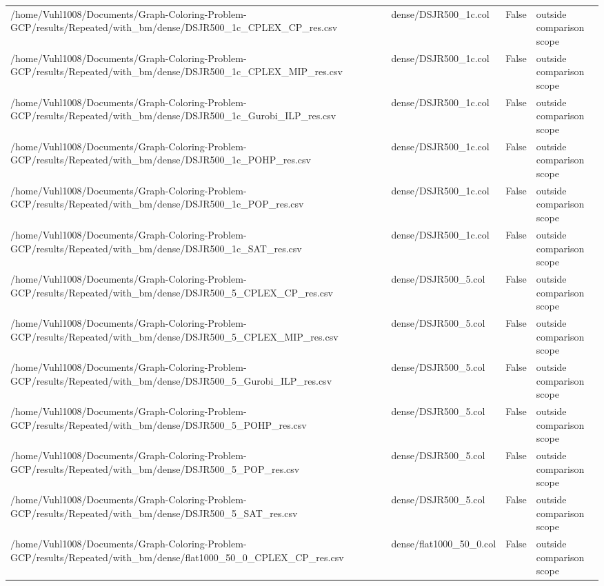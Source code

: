 \begin{table}[htbp]
\begin{tabular}{llll}
/home/Vuhl1008/Documents/Graph-Coloring-Problem-GCP/results/Repeated/with\_bm/dense/DSJR500\_1c\_CPLEX\_CP\_res.csv & dense/DSJR500\_1c.col & False & outside comparison scope \\
/home/Vuhl1008/Documents/Graph-Coloring-Problem-GCP/results/Repeated/with\_bm/dense/DSJR500\_1c\_CPLEX\_MIP\_res.csv & dense/DSJR500\_1c.col & False & outside comparison scope \\
/home/Vuhl1008/Documents/Graph-Coloring-Problem-GCP/results/Repeated/with\_bm/dense/DSJR500\_1c\_Gurobi\_ILP\_res.csv & dense/DSJR500\_1c.col & False & outside comparison scope \\
/home/Vuhl1008/Documents/Graph-Coloring-Problem-GCP/results/Repeated/with\_bm/dense/DSJR500\_1c\_POHP\_res.csv & dense/DSJR500\_1c.col & False & outside comparison scope \\
/home/Vuhl1008/Documents/Graph-Coloring-Problem-GCP/results/Repeated/with\_bm/dense/DSJR500\_1c\_POP\_res.csv & dense/DSJR500\_1c.col & False & outside comparison scope \\
/home/Vuhl1008/Documents/Graph-Coloring-Problem-GCP/results/Repeated/with\_bm/dense/DSJR500\_1c\_SAT\_res.csv & dense/DSJR500\_1c.col & False & outside comparison scope \\
/home/Vuhl1008/Documents/Graph-Coloring-Problem-GCP/results/Repeated/with\_bm/dense/DSJR500\_5\_CPLEX\_CP\_res.csv & dense/DSJR500\_5.col & False & outside comparison scope \\
/home/Vuhl1008/Documents/Graph-Coloring-Problem-GCP/results/Repeated/with\_bm/dense/DSJR500\_5\_CPLEX\_MIP\_res.csv & dense/DSJR500\_5.col & False & outside comparison scope \\
/home/Vuhl1008/Documents/Graph-Coloring-Problem-GCP/results/Repeated/with\_bm/dense/DSJR500\_5\_Gurobi\_ILP\_res.csv & dense/DSJR500\_5.col & False & outside comparison scope \\
/home/Vuhl1008/Documents/Graph-Coloring-Problem-GCP/results/Repeated/with\_bm/dense/DSJR500\_5\_POHP\_res.csv & dense/DSJR500\_5.col & False & outside comparison scope \\
/home/Vuhl1008/Documents/Graph-Coloring-Problem-GCP/results/Repeated/with\_bm/dense/DSJR500\_5\_POP\_res.csv & dense/DSJR500\_5.col & False & outside comparison scope \\
/home/Vuhl1008/Documents/Graph-Coloring-Problem-GCP/results/Repeated/with\_bm/dense/DSJR500\_5\_SAT\_res.csv & dense/DSJR500\_5.col & False & outside comparison scope \\
/home/Vuhl1008/Documents/Graph-Coloring-Problem-GCP/results/Repeated/with\_bm/dense/flat1000\_50\_0\_CPLEX\_CP\_res.csv & dense/flat1000\_50\_0.col & False & outside comparison scope \\

\end{tabular}
\end{table}

